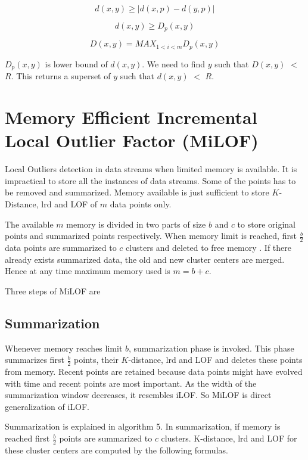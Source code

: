 \[  d(x,y) \geq |{d(x,p) - d(y,p)}| \]

\[  d(x,y) \geq D_p(x,y) \]


\[ D(x,y) =MAX_{1 < i <m} D_p(x,y) \]

$D_p(x,y)$ is lower bound of $d(x,y)$. We need to find $y$ such that $D(x,y)$ $<$ $R$. This returns a superset of $y$ such that $d(x,y)$ $<$ $R$.





\section{Memory Efficient Incremental Local Outlier Factor (MiLOF)}

Local Outliers detection in data streams when limited memory is available. It is impractical to store all the instances of data streams. Some of the points has to be removed and summarized. Memory available is just sufficient to store $K$-Distance, lrd and LOF of $m$ data points only.

The available $m$ memory is divided in two parts of size $b$ and $c$ to store original points and summarized points respectively. When memory limit is reached, first ${\frac{b}{2}}$  data points are summarized to $c$ clusters and deleted to free memory \cite{d}. If there already exists summarized data, the old and new cluster centers are merged. Hence at any time maximum memory used is $m=b+c$.


Three steps of MiLOF are 

\subsection{Summarization}
Whenever memory reaches limit $b$, summarization phase is invoked. This phase summarizes first ${\frac{b}{2}}$ points, their $K$-distance, lrd and LOF and deletes these points from memory. Recent points are retained because data points might have evolved with time and recent points are most important. As the width of the summarization window decreases, it resembles iLOF. So MiLOF is direct generalization of iLOF.

\par 
Summarization  is explained in algorithm 5.
In summarization, if memory is reached first $\frac{b}{2}$ points are summarized to $c$ clusters. K-distance, lrd and LOF for these cluster centers are computed by the following formulas.  

